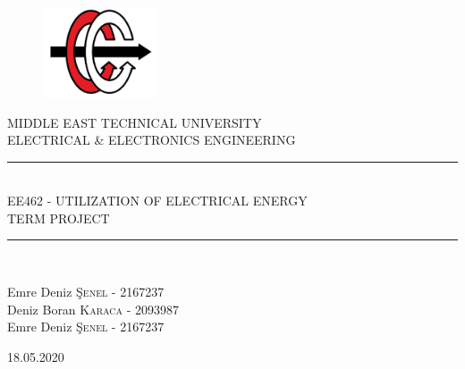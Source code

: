 \begin{titlepage}
\newcommand{\HRule}{\rule{\linewidth}{0.5mm}}
\setlength{\topmargin}{0 in}
\begin{center}
\begin{figure}[!h]
\centering
\includegraphics [width=0.3\textwidth]{eelogo.png}
\end{figure}

\vspace{10mm}
\Huge{MIDDLE EAST TECHNICAL UNIVERSITY}\\
\vspace{5mm}
{\LARGE ELECTRICAL \& ELECTRONICS ENGINEERING}\\

\HRule\\[0.4cm]
\textsc{\Large{EE462 - UTILIZATION OF ELECTRICAL ENERGY}}\\
\textsc{\Large{TERM PROJECT}}
\HRule\\[0.4cm]

\vspace{3mm}

\end{center}
\begin{minipage}{0.5\textwidth}
		\begin{flushleft}
			\large
			Emre Deniz  \textsc{Şenel - 2167237}\\
			Deniz Boran  \textsc{Karaca - 2093987}\\
			Emre Deniz  \textsc{Şenel - 2167237}\\
		\end{flushleft}
	\end{minipage}


\vspace{10mm}
\begin{center}
\large{18.05.2020}
\end{center}

\end{titlepage}